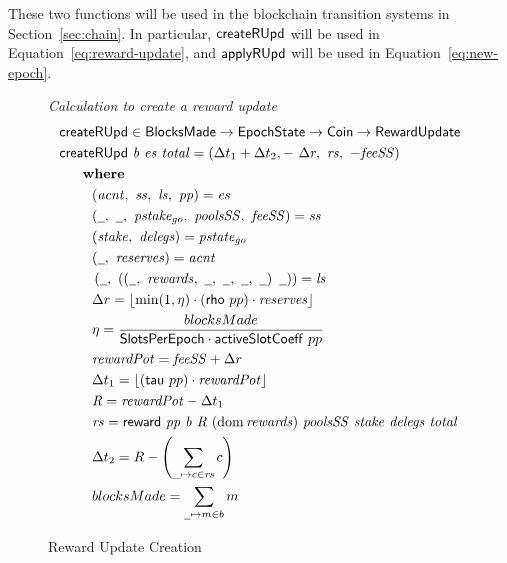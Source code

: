 These two functions will be used in the blockchain transition systems in Section~\ref{sec:chain}.
In particular,
$\mathsf{createRUpd}$ will be used in Equation~\ref{eq:reward-update},
and $\mathsf{applyRUpd}$ will be used in Equation~\ref{eq:new-epoch}.

\begin{figure}[htb]
  \emph{Calculation to create a reward update}
  \begin{align*}
    & \fun{createRUpd} \in \BlocksMade \to \EpochState \to \Coin \to \RewardUpdate \\
    & \createRUpd{b}{es}{total} = \left(
      \Delta t_1+\Delta t_2,-~\Delta r,~\var{rs},~-\var{feeSS}\right) \\
    & ~~~\where \\
    & ~~~~~~~(\var{acnt},~\var{ss},~\var{ls},~\var{pp}) = \var{es} \\
    & ~~~~~~~(\wcard,~\wcard,~\var{pstake_{go}},~\var{poolsSS},~\var{feeSS}) = \var{ss}\\
    & ~~~~~~~(\var{stake},~\var{delegs}) = \var{pstate_{go}} \\
    & ~~~~~~~(\wcard,~\var{reserves}) = \var{acnt} \\
    & ~~~~~~~\left(
      \wcard,~
      \left(
      \left(\wcard,~\var{rewards},~\wcard,~\wcard,~\wcard,~\wcard\right)~
      \wcard
      \right)
      \right) = \var{ls} \\
    & ~~~~~~~\Delta r = \floor*{\min(1,\eta) \cdot (\fun{rho}~{pp}) \cdot
      \var{reserves}}
    \\
    & ~~~~~~~\eta = \frac{blocksMade}{\SlotsPerEpoch \cdot \fun{activeSlotCoeff}~{pp}} \\
    & ~~~~~~~\var{rewardPot} = \var{feeSS} + \Delta r \\
    & ~~~~~~~\Delta t_1 = \floor*{(\fun{tau}~{pp}) \cdot \var{rewardPot}} \\
    & ~~~~~~~\var{R} = \var{rewardPot} - \Delta t_1 \\
    & ~~~~~~~\var{rs}
      = \reward{pp}{b}{R}{(\dom{rewards})}{poolsSS}{stake}{delegs}{total} \\
    & ~~~~~~~\Delta t_{2} = R - \left(\sum\limits_{\_\mapsto c\in\var{rs}}c\right) \\
    & ~~~~~~~blocksMade = \sum_{\wcard \mapsto m \in b}m
  \end{align*}

  \caption{Reward Update Creation}
  \label{fig:functions:reward-update-creation}
\end{figure}

